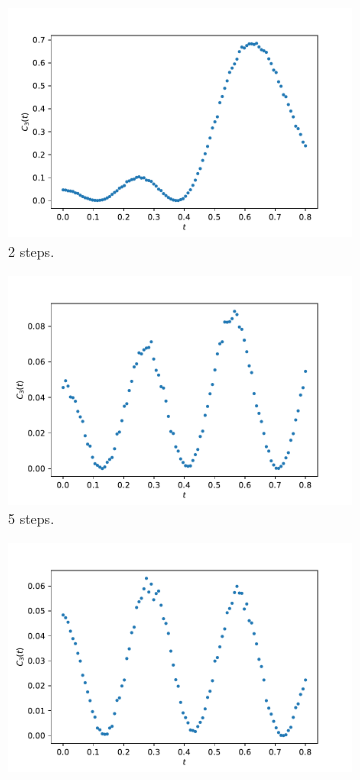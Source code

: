 \documentclass[10 pt, a4paper]{article}
\begin{document}
\begin{figure}[H]
\centering
\begin{subfigure}{.32\textwidth}
  \centering
  \includegraphics[width=\linewidth]{ThreeBodyContactGates2}
  \caption{2 steps.}
  \label{fig:sub1}
\end{subfigure}
\begin{subfigure}{.32\textwidth}
  \centering
  \includegraphics[width=\linewidth]{ThreeBodyContactGates5}
  \caption{5 steps.}
  \label{fig:sub2}
\end{subfigure}
\begin{subfigure}{.32\textwidth}
  \centering
  \includegraphics[width=\linewidth]{ThreeBodyContactGates10}

\end{subfigure}
\end{figure}
\end{document}
